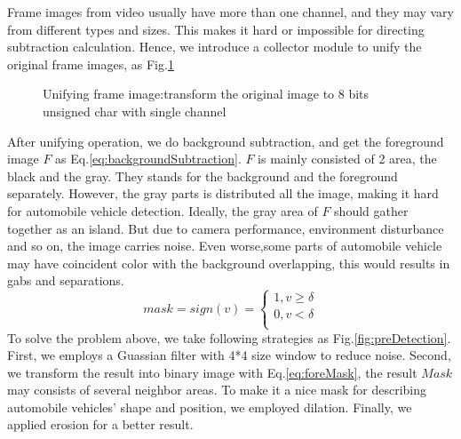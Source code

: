 \documentclass[draftclsnofoot,onecolumn]{IEEEtran}
\begin{document}
	Frame images from video usually have more than one channel, and they may vary from different types and sizes. This makes it hard or impossible for directing subtraction calculation. Hence, we introduce a collector module to unify the original frame images, as Fig.\ref{fig:unifyDiagram}
	\begin{figure}[!h]
	\centering
	\caption{Unifying frame image:transform the original image to 8 bits unsigned char with single channel}
	\label{fig:unifyDiagram}
	\end{figure}
	
	After unifying operation, we do background subtraction, and get the foreground image $F$ as Eq.\ref{eq:backgroundSubtraction}. $F$ is mainly consisted of 2 area, the black and the gray. They stands for the background and the foreground separately. However, the gray parts is distributed all the image, making it hard for automobile vehicle detection. Ideally, the gray area of $F$ should gather together as an island. But due to camera performance, environment disturbance and so on, the image carries noise. Even worse,some parts of automobile vehicle may have coincident color with the background overlapping, this would results in gabs and separations.
	\begin{equation}
	  mask=sign(v)=\left\{
	   \begin{aligned}
	   	1, v \geq \delta \\
	   	0, v < \delta \\
	   \end{aligned}
	   \right.
	   \label{eq:foreMask}
	\end{equation}		
	To solve the problem above, we take following strategies as Fig.\ref{fig:preDetection}. First, we employs a Guassian filter with 4*4 size window to reduce noise. Second, we transform the result into binary image with Eq.\ref{eq:foreMask}, the result $Mask$ may consists of several neighbor areas. To make it a nice mask for describing automobile vehicles' shape and position, we employed dilation. Finally, we applied erosion for a better result. 
	
\end{document}
